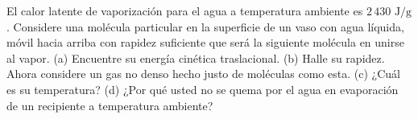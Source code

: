 \item El calor latente de vaporización para el agua a temperatura ambiente es $2\,430\text{ J/g}$. Considere una molécula particular en la superficie de un vaso con agua líquida, móvil hacia arriba con rapidez suficiente que será la siguiente molécula en unirse al vapor. (a) Encuentre su energía cinética traslacional. (b) Halle su rapidez. Ahora considere un gas no denso hecho justo de moléculas como esta. (c) ¿Cuál es su temperatura? (d) ¿Por qué usted no se quema por el agua en evaporación de un recipiente a temperatura ambiente?
